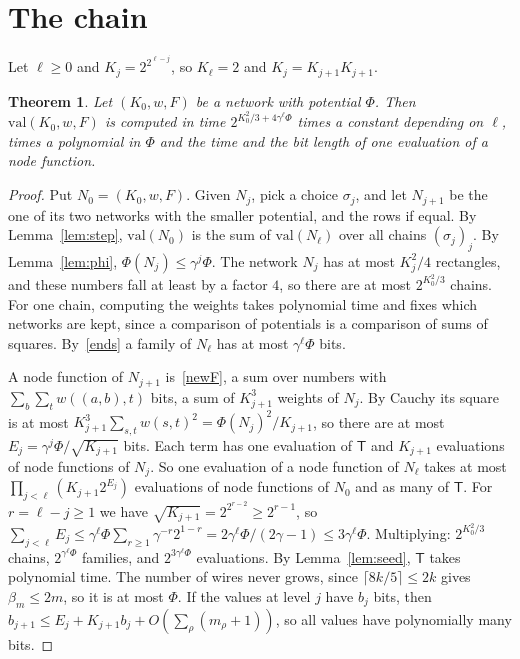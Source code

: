 \documentclass[10pt]{article}
\newtheorem{theorem}{Theorem}
\newcommand{\val}{\mathrm{val}}
\begin{document}
\section{The chain}

Let $\ell\ge0$ and $K_j=2^{2^{\ell-j}}$, so $K_{\ell}=2$ and $K_j=K_{j+1}K_{j+1}$.

\begin{theorem}\label{thm:net}
Let $(K_0,w,F)$ be a network with potential $\Phi$. Then $\val(K_0,w,F)$ is computed in time $2^{K_0^2/3+4\gamma^{\ell}\Phi}$ times a constant depending on $\ell$, times a polynomial in $\Phi$ and the time and the bit length of one evaluation of a node function.
\end{theorem}
\begin{proof}
Put $N_0=(K_0,w,F)$. Given $N_j$, pick a choice $\sigma_j$, and let $N_{j+1}$ be the one of its two networks with the smaller potential, and the rows if equal. By Lemma~\ref{lem:step}, $\val(N_0)$ is the sum of $\val(N_{\ell})$ over all chains $(\sigma_j)_j$. By Lemma~\ref{lem:phi}, $\Phi(N_j)\le\gamma^j\Phi$. The network $N_j$ has at most $K_j^2/4$ rectangles, and these numbers fall at least by a factor $4$, so there are at most $2^{K_0^2/3}$ chains. For one chain, computing the weights takes polynomial time and fixes which networks are kept, since a comparison of potentials is a comparison of sums of squares. By~\eqref{ends} a family of $N_{\ell}$ has at most $\gamma^{\ell}\Phi$ bits.

A node function of $N_{j+1}$ is~\eqref{newF}, a sum over numbers with $\sum_b\sum_tw((a,b),t)$ bits, a sum of $K_{j+1}^3$ weights of $N_j$. By Cauchy its square is at most $K_{j+1}^3\sum_{s,t}w(s,t)^2=\Phi(N_j)^2/K_{j+1}$, so there are at most $E_j=\gamma^j\Phi/\sqrt{K_{j+1}}$ bits. Each term has one evaluation of $\mathsf T$ and $K_{j+1}$ evaluations of node functions of $N_j$. So one evaluation of a node function of $N_{\ell}$ takes at most $\prod_{j<\ell}(K_{j+1}2^{E_j})$ evaluations of node functions of $N_0$ and as many of $\mathsf T$. For $r=\ell-j\ge1$ we have $\sqrt{K_{j+1}}=2^{2^{r-2}}\ge2^{r-1}$, so $\sum_{j<\ell}E_j\le\gamma^{\ell}\Phi\sum_{r\ge1}\gamma^{-r}2^{1-r}=2\gamma^{\ell}\Phi/(2\gamma-1)\le3\gamma^{\ell}\Phi$. Multiplying: $2^{K_0^2/3}$ chains, $2^{\gamma^{\ell}\Phi}$ families, and $2^{3\gamma^{\ell}\Phi}$ evaluations. By Lemma~\ref{lem:seed}, $\mathsf T$ takes polynomial time. The number of wires never grows, since $\lceil8k/5\rceil\le2k$ gives $\beta_m\le2m$, so it is at most $\Phi$. If the values at level $j$ have $b_j$ bits, then $b_{j+1}\le E_j+K_{j+1}b_j+O(\sum_\rho(m_\rho+1))$, so all values have polynomially many bits.
\end{proof}
\end{document}
